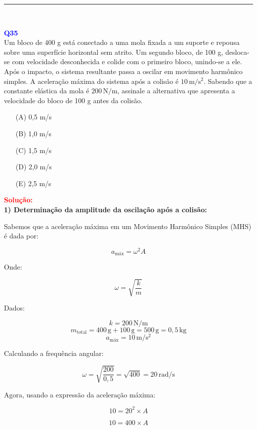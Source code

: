 \documentclass[a4paper,12pt]{article}
\begin{document}
\noindent\rule{\linewidth}{0.6pt}\\

\begin{flushleft}
\textbf{\textcolor{blue}{\Large Q35}}\\

Um bloco de 400 g está conectado a uma mola fixada a um suporte e repousa sobre uma superfície horizontal sem atrito. 
Um segundo bloco, de 100 g, desloca-se com velocidade desconhecida e colide com o primeiro bloco, unindo-se a ele. Após 
o impacto, o sistema resultante passa a oscilar em movimento harmônico simples. A aceleração máxima do sistema após a colisão 
é $10\,\mathrm{m/s^2}$. Sabendo que a constante elástica da mola é $200\,\mathrm{N/m}$, assinale a alternativa que apresenta a 
velocidade do bloco de 100 g antes da colisão.


\begin{itemize}
\item[(A)] 0,5 m/s
\item[(B)] 1,0 m/s
\item[(C)] 1,5 m/s
\item[(D)] 2,0 m/s
\item[(E)] 2,5 m/s
\end{itemize}

\vspace{0.5cm}

\textcolor{red}{\textbf{Solução:}}\\

\textbf{1) Determinação da amplitude da oscilação após a colisão:}

Sabemos que a aceleração máxima em um Movimento Harmônico Simples (MHS) é dada por:

\[
a_{\text{máx}} = \omega^2 A
\]

Onde:

\[
\omega = \sqrt{\frac{k}{m}}
\]

Dados:

\[
k = 200\,\mathrm{N/m}
\]
\[
m_{\text{total}} = 400\,\mathrm{g} + 100\,\mathrm{g} = 500\,\mathrm{g} = 0,5\,\mathrm{kg}
\]
\[
a_{\text{máx}} = 10\,\mathrm{m/s^2}
\]

Calculando a frequência angular:

\[
\omega = \sqrt{\frac{200}{0,5}} = \sqrt{400} = 20\,\mathrm{rad/s}
\]

Agora, usando a expressão da aceleração máxima:

\[
10 = 20^2 \times A
\]

\[
10 = 400 \times A
\]


\end{flushleft}
\end{document}
